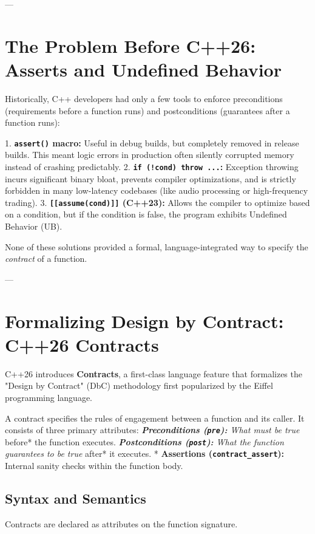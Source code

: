 {{---

\section{The Problem Before C++26: Asserts and Undefined Behavior}

Historically, C++ developers had only a few tools to enforce preconditions (requirements before a function runs) and postconditions (guarantees after a function runs):

1. \textbf{\texttt{assert()} macro:} Useful in debug builds, but completely removed in release builds. This meant logic errors in production often silently corrupted memory instead of crashing predictably.
2. \textbf{\texttt{if (!cond) throw ...}:} Exception throwing incurs significant binary bloat, prevents compiler optimizations, and is strictly forbidden in many low-latency codebases (like audio processing or high-frequency trading).
3. \textbf{\texttt{[[assume(cond)]]} (C++23):} Allows the compiler to optimize based on a condition, but if the condition is false, the program exhibits Undefined Behavior (UB).

None of these solutions provided a formal, language-integrated way to specify the \textit{contract} of a function.

---

\section{Formalizing Design by Contract: C++26 Contracts}

C++26 introduces \textbf{Contracts}, a first-class language feature that formalizes the "Design by Contract" (DbC) methodology first popularized by the Eiffel programming language.

A contract specifies the rules of engagement between a function and its caller. It consists of three primary attributes:
\textit{   \textbf{Preconditions (\texttt{pre}):} What must be true }before* the function executes.
\textit{   \textbf{Postconditions (\texttt{post}):} What the function guarantees to be true }after* it executes.
*   \textbf{Assertions (\texttt{contract_assert}):} Internal sanity checks within the function body.

\subsection{Syntax and Semantics}

Contracts are declared as attributes on the function signature.

}}
